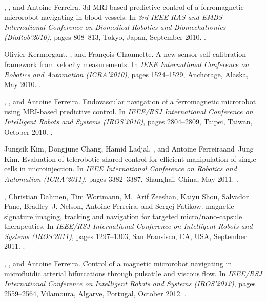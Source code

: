 \begin{Mybibliography}{10}
  \KBelharet, \DavidFolio, and Antoine Ferreira.
  \newblock 3d {MRI}-based predictive control of a ferromagnetic microrobot
  navigating in blood vessels.
  \newblock In \emph{3rd IEEE RAS and EMBS International Conference on Biomedical
    Robotics and Biomechatronics (BioRob'2010)}, pages 808--813, Tokyo, Japan,
  September 2010{}.
  \newblock {}.
  
  Olivier Kermorgant, \DavidFolio, and François Chaumette.
  \newblock A new sensor self-calibration framework from velocity measurements.
  \newblock In \emph{IEEE International Conference on Robotics and Automation
    (ICRA'2010)}, pages 1524--1529, Anchorage, Alaska, May 2010.
  \newblock {}.
  
  \KBelharet, \DavidFolio, and Antoine Ferreira.
  \newblock Endovascular navigation of a ferromagnetic microrobot using
  {MRI}-based predictive control.
  \newblock In \emph{IEEE/RSJ International Conference on Intelligent Robots and
    Systems (IROS'2010)}, pages 2804--2809, Taipei, Taiwan, October
  2010{}.
  \newblock {}.
  
  Jungsik Kim, Dongjune Chang, Hamid Ladjal, \DavidFolio, and Antoine
  Ferreiraand~Jung Kim.
  \newblock Evaluation of telerobotic shared control for efficient manipulation
  of single cells in microinjection.
  \newblock In \emph{IEEE International Conference on Robotics and Automation
    (ICRA'2011)}, pages 3382--3387, Shanghai, China, May 2011.
  \newblock {}.
  
 \DavidFolio, Christian Dahmen, Tim Wortmann, M.~Arif Zeeshan, Kaiyu Shou,
 Salvador Pane, Bradley~J. Nelson, Antoine Ferreira, and Sergej Fatikow.
  magnetic signature imaging, tracking and navigation for
 targeted micro/nano-capsule therapeutics.
 \newblock In \emph{IEEE/RSJ International Conference on Intelligent Robots and
   Systems (IROS'2011)}, pages 1297--1303, San Fransisco, CA, USA, September
 2011.
 \newblock {}.
  
  \KBelharet, \DavidFolio, and Antoine Ferreira.
  \newblock Control of a magnetic microrobot navigating in microfluidic arterial
  bifurcations through pulsatile and viscous flow.
  \newblock In \emph{IEEE/RSJ International Conference on Intelligent Robots and
    Systems (IROS'2012)}, pages 2559--2564, Vilamoura, Algarve, Portugal, October
  2012{}.
  \newblock {}.


\end{Mybibliography}

